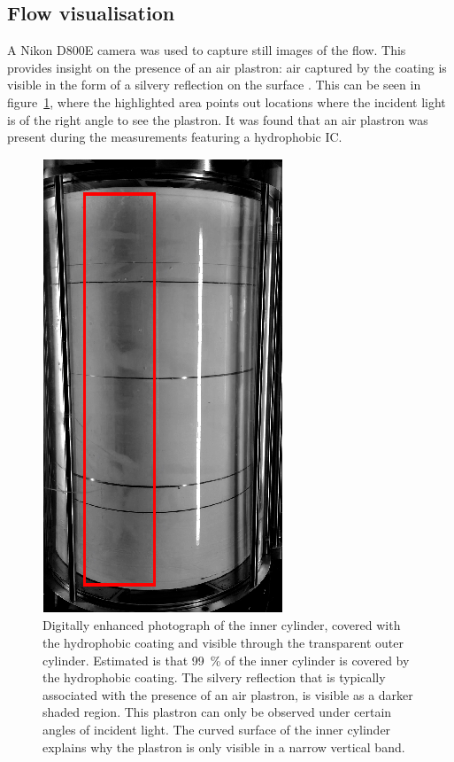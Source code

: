 \subsection{Flow visualisation}
A Nikon D800E camera was used to capture still images of the flow. This provides insight on the presence of an air plastron: air captured by the coating is visible in the form of a silvery reflection on the surface \citet{Shirtcliffe2006,McHale2009,Daniello2009,Poetes2010,Mchale2011,Dong2013,Park2014,Park2015,
Saranadhi2016}. This can be seen in figure~\ref{fig:photo_coating_glow}, where the highlighted area points out locations where the incident light is of the right angle to see the plastron. It was found that an air plastron was present during the measurements featuring a {hydrophobic} IC.

\begin{figure}
\centering
\includegraphics[width=0.4 \textwidth]{Figures/fig4}
\caption{Digitally enhanced photograph of the inner cylinder, covered with the {hydrophobic} coating and visible through the transparent outer cylinder. Estimated is that \SI{99}{\percent} of the inner cylinder is covered by the {hydrophobic} coating. The silvery reflection that is typically associated with the presence of an air plastron, is visible as a darker shaded region. This plastron can only be observed under certain angles of incident light. The curved surface of the inner cylinder explains why the plastron is only visible in a narrow vertical band.}\label{fig:photo_coating_glow}
\end{figure}

